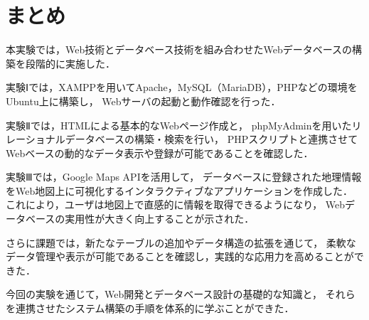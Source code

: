 \section{まとめ}

本実験では，Web技術とデータベース技術を組み合わせたWebデータベースの構築を段階的に実施した．

実験Ⅰでは，XAMPPを用いてApache，MySQL（MariaDB），PHPなどの環境をUbuntu上に構築し，
Webサーバの起動と動作確認を行った．

実験Ⅱでは，HTMLによる基本的なWebページ作成と，
phpMyAdminを用いたリレーショナルデータベースの構築・検索を行い，
PHPスクリプトと連携させてWebベースの動的なデータ表示や登録が可能であることを確認した．

実験Ⅲでは，Google Maps APIを活用して，
データベースに登録された地理情報をWeb地図上に可視化するインタラクティブなアプリケーションを作成した．
これにより，ユーザは地図上で直感的に情報を取得できるようになり，
Webデータベースの実用性が大きく向上することが示された．

さらに課題では，新たなテーブルの追加やデータ構造の拡張を通じて，
柔軟なデータ管理や表示が可能であることを確認し，実践的な応用力を高めることができた．

今回の実験を通じて，Web開発とデータベース設計の基礎的な知識と，
それらを連携させたシステム構築の手順を体系的に学ぶことができた．
